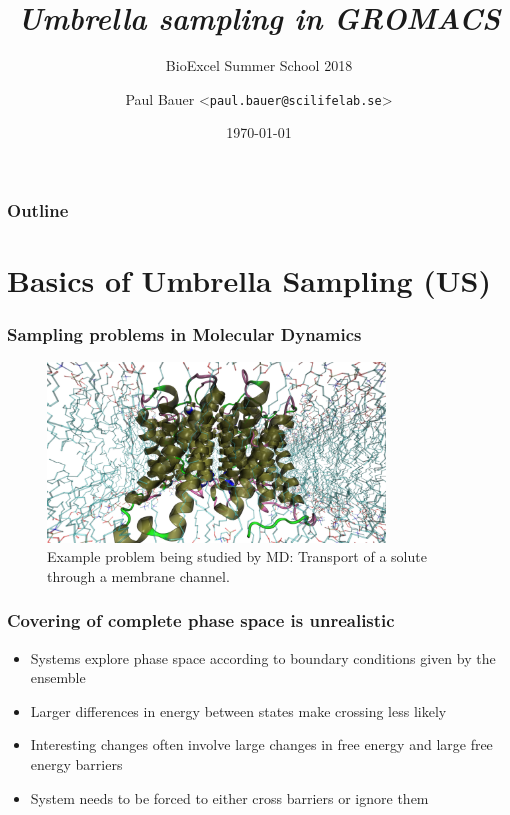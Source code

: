 \documentclass{beamer}
\title{\emph{Umbrella sampling in GROMACS}}
\subtitle{BioExcel Summer School 2018}
\author[Paul Bauer]%
{Paul Bauer <\texttt{paul.bauer@scilifelab.se}>}
\institute[SciLifeLab, KTH] %
{
  SciLifeLab\\
  KTH
}
\date[\footnotesize{\today}] %
{\today}
\numberwithin{table}{section}
\numberwithin{figure}{section}
\numberwithin{equation}{section}
\begin{document}
\begin{frame}[plain] %
  \titlepage
\end{frame}

\begin{frame}
    \frametitle{Outline}
    \tableofcontents[hideallsubsections]
\end{frame}


\section{Basics of Umbrella Sampling (US)}

\begin{frame}
\frametitle{Sampling problems in Molecular Dynamics}
    \begin{figure}[htb]
        \centering
        \includegraphics[keepaspectratio=true, width=0.8\textwidth]{figures/system.png}
        \caption{Example problem being studied by MD: Transport of a solute through a membrane channel.}
    \end{figure}
\end{frame}

\begin{frame}
\frametitle{Covering of complete phase space is unrealistic}
    \begin{itemize}
        \item{Systems explore phase space according to boundary conditions given by the ensemble}
        \item{Larger differences in energy between states make crossing less likely}
        \item{Interesting changes often involve large changes in free energy and large free energy barriers}
        \item{System needs to be forced to either cross barriers or ignore them}
    \end{itemize}
\end{frame}
\end{document}
